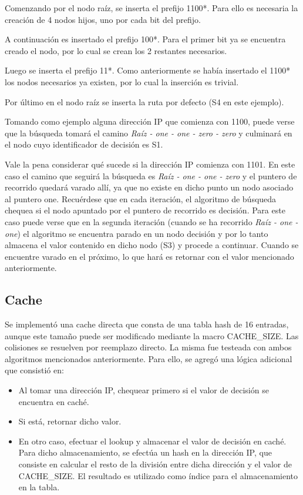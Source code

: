 Comenzando por el nodo raíz, se inserta el prefijo 1100*. Para ello es necesaria la creación de 4 nodos hijos, uno por cada bit del prefijo. 

A continuación es insertado el prefijo 100*. Para el primer bit ya se encuentra creado el nodo, por lo cual se crean los 2 restantes necesarios.

Luego se inserta el prefijo 11*. Como anteriormente se había insertado el 1100* los nodos necesarios ya existen, por lo cual la inserción es trivial.

Por último en el nodo raíz se inserta la ruta por defecto (S4 en este ejemplo).

Tomando como ejemplo alguna dirección IP que comienza con 1100, puede verse que la búsqueda tomará el camino \textit{Raíz - one - one - zero - zero} y culminará en el nodo cuyo identificador de decisión es S1. 

Vale la pena considerar qué sucede si la dirección IP comienza con 1101. En este caso el camino que seguirá la búsqueda es \textit{Raíz - one - one - zero} y el puntero de recorrido quedará varado allí, ya que no existe en dicho punto un nodo asociado al puntero one. Recuérdese que en cada iteración, el algoritmo de búsqueda chequea si el nodo apuntado por el puntero de recorrido es decisión. Para este caso puede verse que en la segunda iteración (cuando se ha recorrido \textit{Raíz - one - one}) el algoritmo se encuentra parado en un nodo decisión y por lo tanto almacena el valor contenido en dicho nodo (S3) y procede a continuar. Cuando se encuentre varado en el próximo, lo que hará es retornar con el valor mencionado anteriormente. 

\subsection {Cache}

Se implementó una cache directa que consta de una tabla hash de 16 entradas, aunque este tamaño puede ser modificado mediante la macro CACHE\_SIZE. Las colisiones se resuelven por reemplazo directo. La misma fue testeada con ambos algoritmos mencionados anteriormente. Para ello, se agregó una lógica adicional que consistió en:

\begin{itemize}
	\item Al tomar una dirección IP, chequear primero si el valor de decisión se encuentra en caché.
	\item Si está, retornar dicho valor.
	\item En otro caso, efectuar el lookup y almacenar el valor de decisión en caché. Para dicho almacenamiento, se efectúa un hash en la dirección IP, que consiste en calcular el resto de la división entre dicha dirección y el valor de CACHE\_SIZE. El resultado es utilizado como índice para el almacenamiento en la tabla.
\end{itemize}

